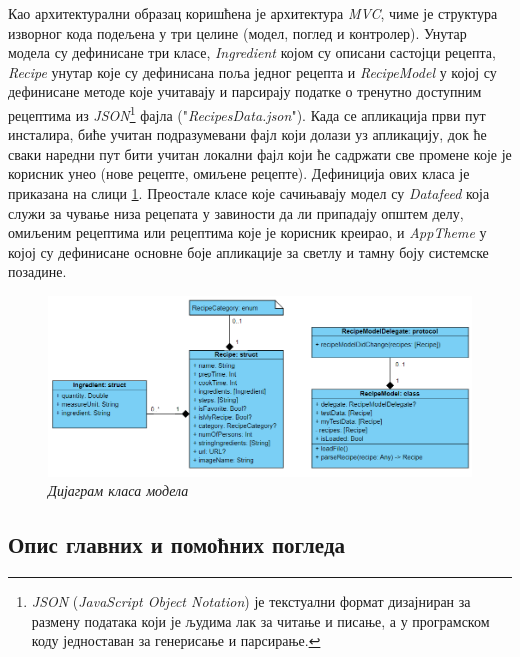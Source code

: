 \documentclass[12pt,oneside]{memoir}
\begin{document}
Као архитектурални образац коришћена је архитектура \textit{MVC}, чиме је структура изворног кода подељена у три целине (модел, поглед и контролер). Унутар модела су дефинисане три класе, \textit{Ingredient} којом су описани састојци рецепта, \textit{Recipe} унутар које су дефинисана поља једног рецепта и \textit{RecipeModel} у којој су дефинисане методе које учитавају и парсирају податке о тренутно доступним рецептима из \textit{JSON}\footnote{\textit{JSON} (\textit{JavaScript Object Notation}) је текстуални формат дизајниран за размену података који је људима лак за читање и писање, а у програмском коду једноставан за генерисање и парсирање.} фајла ("\textit{RecipesData.json}"). Када се апликација први пут инсталира, биће учитан подразумевани фајл који долази уз апликацију, док ће сваки наредни пут бити учитан локални фајл који ће садржати све промене које је корисник унео (нове рецепте, омиљене рецепте). Дефиниција ових класа је приказана на слици \ref{slika:класе_модела}. Преостале класе које сачињавају модел су \textit{Datafeed} која служи за чување низа рецепата у завиности да ли припадају општем делу, омиљеним рецептима или рецептима које је корисник креирао, и \textit{AppTheme} у којој су дефинисане основне боје апликације за светлу и тамну боју системске позадине.

\begin{figure} [H]
    \centering
    \captionsetup{justification=centering}
    \includegraphics[width=1\textwidth]{images/class_diagram.png} 
    \caption{\textit{Дијаграм класа модела}}
    \label{slika:класе_модела}
\end{figure}

\subsection{Опис главних и помоћних погледа}
\end{document}
